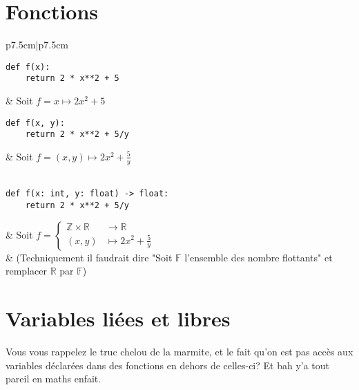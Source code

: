 \documentclass{article}
\newcommand{\R}{{\mathbb R}}
\newcommand{\Z}{{\mathbb Z}}
\begin{document}


\section{Fonctions}

\begin{table}[H]
	\centering
	\begin{tabular}{p{7.5cm}|p{7.5cm}}
\begin{minipage}{0.5\linewidth}
\begin{verbatim}
def f(x):
	return 2 * x**2 + 5
\end{verbatim}
\end{minipage}
       & Soit $f = x\mapsto 2x^2+5$ \\
\begin{minipage}{0.5\linewidth}
\begin{verbatim}
def f(x, y):
	return 2 * x**2 + 5/y
\end{verbatim} 
\end{minipage} 
	   & Soit $f = (x, y)\mapsto 2x^2+\frac{5}{y}$ \\
\\
\begin{minipage}{0.5\linewidth}
\begin{verbatim}
def f(x: int, y: float) -> float:
	return 2 * x**2 + 5/y
\end{verbatim} 
\end{minipage} 
	   & Soit $f = \begin{cases}
		   \Z \times \R &\to \R\\
			(x, y)&\mapsto 2x^2+\frac{5}{y}
		\end{cases}$ \\& {\footnotesize (Techniquement il faudrait dire "Soit $\mathbb{F}$ l'ensemble des nombre flottants" et remplacer $\R$ par $\mathbb{F}$)}
\end{tabular}

\end{table}

\section{Variables liées et libres}

Vous vous rappelez le truc chelou de la marmite, et le fait qu'on est pas accès aux variables déclarées dans des fonctions en dehors de celles-ci? Et bah y'a tout pareil en maths enfait.
\end{document}
